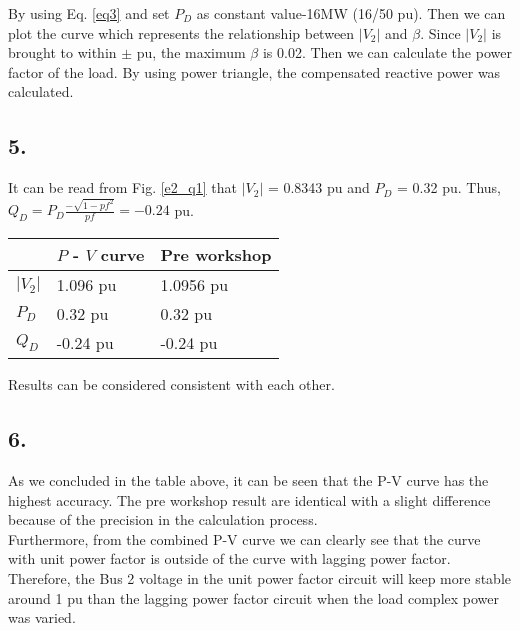\documentclass{article}
\begin{document}
By using Eq. \ref{eq3} and set $P_D$ as constant value-16MW (16/50 pu). Then we can plot the curve which represents the relationship between $|V_2|$ and $\beta$. Since $|V_2|$ is brought to within $\pm$ pu, the maximum $\beta$ is 0.02. Then we can calculate the power factor of the load. By using power triangle, the compensated reactive power was calculated.

\subsection*{5.}
It can be read from Fig. \ref{e2_q1} that $|V_2|$ = 0.8343 pu and $P_D$ = 0.32 pu. Thus, $Q_D = P_D \frac{-\sqrt{1 - pf^2}}{pf} = -0.24$ pu.

\begin{tabu} to \textwidth {XXX}
\toprule
&$P$ - $V$ curve &Pre workshop\\
\hline
$|V_2|$ &1.096 pu &1.0956 pu\\
\hline
$P_D$ &0.32 pu &0.32 pu\\
\hline
$Q_D$ &-0.24 pu &-0.24 pu\\
\bottomrule
\end{tabu}

\vspace{9pt}
Results can be considered consistent with each other.

\subsection*{6.}
As we concluded in the table above, it can be seen that the P-V curve has the highest accuracy. The pre workshop result are identical with a slight difference because of the precision in the calculation process.\\

Furthermore, from the combined P-V curve we can clearly see that the curve with unit power factor is outside of the curve with lagging power factor. Therefore, the Bus 2 voltage in the unit power factor circuit will keep more stable around 1 pu than the lagging power factor circuit when the load complex power was varied.

\end{document}
